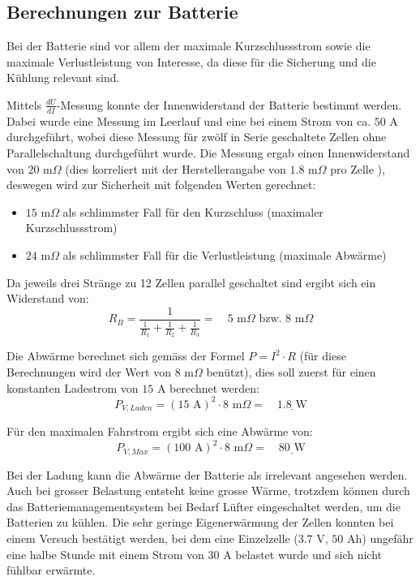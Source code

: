 \subsection{Berechnungen zur Batterie}
Bei der Batterie sind vor allem der maximale Kurzschlussstrom sowie die maximale Verlustleistung von Interesse, da diese für die Sicherung und die Kühlung relevant sind.

Mittels $\frac{dU}{dI}$-Messung konnte der Innenwiderstand der Batterie bestimmt werden. Dabei wurde eine Messung im Leerlauf und eine bei einem Strom von ca. $50$ A durchgeführt, wobei diese Messung für zwölf in Serie geschaltete Zellen ohne Parallelschaltung durchgeführt wurde. Die Messung ergab einen Innenwiderstand von $20$ m$\Omega$ (dies korreliert mit der Herstellerangabe von $1.8$ m$\Omega$ pro Zelle \cite{lev50}), deswegen wird zur Sicherheit mit folgenden Werten gerechnet:
\begin{itemize}
	\item $15$ m$\Omega$ als schlimmster Fall für den Kurzschluss (maximaler Kurzschlussstrom)
	\item $24$ m$\Omega$ als schlimmster Fall für die Verlustleistung (maximale Abwärme)
\end{itemize}

Da jeweils drei Stränge zu 12 Zellen parallel geschaltet sind ergibt sich ein Widerstand von:
\begin{equation*}
	R_B=\frac{1}{\frac{1}{R_1}+\frac{1}{R_2}+\frac{1}{R_3}}=\quad 5\text{ m}\Omega\text{ bzw. } 8\text{ m}\Omega
\end{equation*}

Die Abwärme berechnet sich gemäss der Formel $P=I^2\cdot R$ (für diese Berechnungen wird der Wert von $8$ m$\Omega$ benützt), dies soll zuerst für einen konstanten Ladestrom von $15$ A berechnet werden:
\begin{equation*}
	P_{V,Laden}=\left(15\text{ A}\right)^2\cdot8\text{ m}\Omega=\quad\underline{1.8\text{ W}}
\end{equation*}

Für den maximalen Fahrstrom ergibt sich eine Abwärme von:
\begin{equation*}
	P_{V,Max}=\left(100\text{ A}\right)^2\cdot8\text{ m}\Omega=\quad\underline{80\text{ W}}
\end{equation*}

Bei der Ladung kann die Abwärme der Batterie als irrelevant angesehen werden. Auch bei grosser Belastung entsteht keine grosse Wärme, trotzdem können durch das Batteriemanagementsystem bei Bedarf Lüfter eingeschaltet werden, um die Batterien zu kühlen. Die sehr geringe Eigenerwärmung der Zellen konnten bei einem Versuch bestätigt werden, bei dem eine Einzelzelle ($3.7$ V, $50$ Ah) ungefähr eine halbe Stunde mit einem Strom von $30$ A belastet wurde und sich nicht fühlbar erwärmte.

